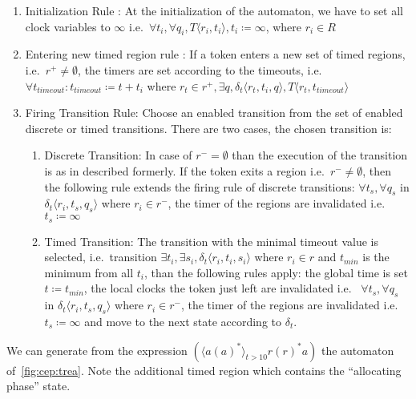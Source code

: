 			\begin{enumerate}
				\item Initialization Rule : At the initialization  of the automaton, we have to set all clock variables to $\infty$ 
				i.e.~$\forall t_i, \forall q_i, T \langle r_i, t_i \rangle, t_i \coloneqq \infty $, where $r_i \in R$
				
				\item Entering new timed region rule :
				If a token enters a new set of timed regions, 
				i.e.~$r^+ \neq \emptyset$, 
				the timers are set according to the timeouts, 
				i.e.~$\forall t_{\textit{timeout}} : t_{\textit{timeout}} \coloneqq t + t_i $ where $ r_t \in r^+, \exists q ,\delta_t\langle  r_t,t_i,q \rangle, T \langle r_t, t_{\textit{timeout}} \rangle$
				
				\item Firing Transition Rule: Choose an enabled transition from the set of enabled discrete or timed transitions. 
				There are two cases, the chosen transition is:
				\begin{enumerate}
					\item Discrete Transition: In case of $r^- = \emptyset$ than the execution of the transition is as in described formerly. 
					If the token exits a region i.e.~$r^- \neq \emptyset$, 
					then the following rule extends the firing rule of discrete transitions:
					$\forall t_s, \forall q_s$ in $ \delta_t \langle r_i, t_s, q_s \rangle$ where $r_i \in r^-$, the timer of the regions are invalidated i.e.~	$t_s \coloneqq \infty$
					\item Timed Transition: The transition with the minimal timeout value is selected, 
					i.e.~transition $\exists t_i, \exists s_i, \delta_t \langle r_i, t_i, s_i \rangle$ where $ r_i \in r$ and $t_{\textit{min}}$ is the minimum from all $t_i$,
					than the following rules apply:
					the global time is set $t \coloneqq t_{\textit{min}}$, 
					the local clocks the token just left are invalidated i.e.~
					$\forall t_s, \forall q_s$ in $ \delta_t \langle r_i, t_s, q_s \rangle$ where $r_i \in r^-$, the timer of the regions are invalidated i.e.~$t_s \coloneqq \infty$ 
					and move to the next state according to $\delta_t$.
				\end{enumerate}			
			\end{enumerate}
			
			
			We can generate from the expression %
			$(\langle a (a)^\ast \rangle_{t > 10} r (r)^\ast a)$
			the automaton of~\cref{fig:cep:trea}.
			Note the additional timed region which contains the ``allocating phase'' state.
			
